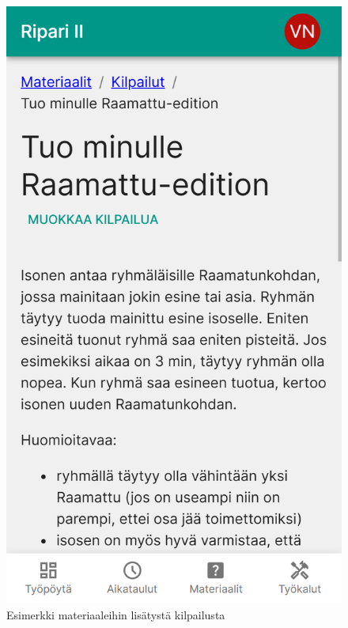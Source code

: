 \begin{figure}[h!]
    \centering
    \begin{minipage}[b]{.3\textwidth}
        \includegraphics[width=\textwidth]{figures/isosapp-materiaalit.png}
        \caption{Esimerkki materiaaleihin lisätystä kilpailusta}
        \label{fig:isosapp-materiaalit}
    \end{minipage}\qquad
    \begin{minipage}[b]{.3\textwidth}

\end{minipage}
\end{figure}
